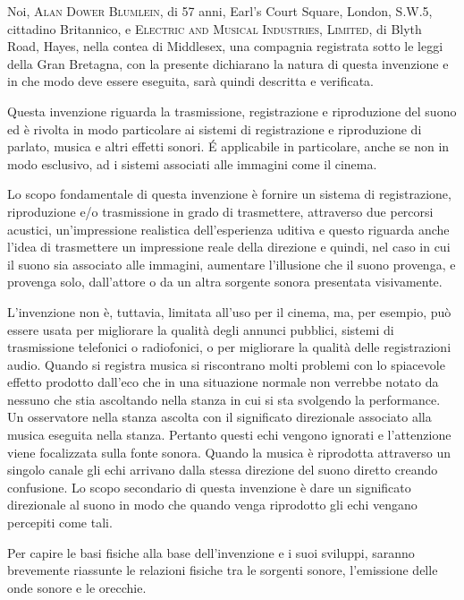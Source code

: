 \documentclass[11pt]{article}
\begin{document}
\begin{multicols*}{2}
\setlength{\parskip}{0pt}

Noi,  \textsc{Alan Dower Blumlein}, di 57 anni, Earl’s Court Square, London, S.W.5, cittadino Britannico, e \textsc{Electric and Musical Industries, Limited}, di Blyth Road, Hayes, nella contea di Middlesex, una compagnia registrata sotto le leggi della Gran Bretagna, con la presente dichiarano la natura di questa invenzione e in che modo deve essere eseguita, sarà quindi descritta e verificata.

Questa invenzione riguarda la trasmissione, registrazione e riproduzione del suono ed è rivolta in modo particolare ai sistemi di registrazione e riproduzione di parlato, musica e altri effetti sonori. É applicabile in particolare, anche se non in modo esclusivo, ad i sistemi associati alle immagini come il cinema.

Lo scopo fondamentale di questa invenzione è fornire un sistema di registrazione, riproduzione e/o trasmissione in grado di trasmettere, attraverso due percorsi acustici, un’impressione realistica dell’esperienza uditiva e questo riguarda anche l’idea di trasmettere un impressione reale della direzione e quindi, nel caso in cui il suono sia associato alle immagini, aumentare l’illusione che il suono provenga, e provenga solo, dall’attore o da un altra sorgente sonora presentata visivamente.

L’invenzione non è, tuttavia, limitata all’uso per il cinema, ma, per esempio, può essere usata per migliorare la qualità degli annunci pubblici, sistemi di trasmissione telefonici o radiofonici, o per migliorare la qualità delle registrazioni audio. Quando si  registra musica si riscontrano molti problemi con lo spiacevole effetto prodotto dall’eco che in una situazione normale non verrebbe notato da nessuno che stia ascoltando nella stanza in cui si sta svolgendo la performance. Un osservatore nella stanza ascolta con il significato direzionale associato alla musica eseguita nella stanza. Pertanto questi echi vengono ignorati e l’attenzione viene focalizzata sulla fonte sonora. Quando la musica è riprodotta attraverso un singolo canale gli echi arrivano dalla stessa direzione del suono diretto creando confusione. Lo scopo secondario di questa invenzione  è dare un significato direzionale al suono in modo che quando venga riprodotto gli echi vengano percepiti come tali.

Per capire le basi fisiche alla base dell’invenzione e i suoi sviluppi, saranno brevemente riassunte le relazioni fisiche tra le sorgenti sonore, l’emissione delle onde sonore e le orecchie.


\end{multicols*}
\end{document}
